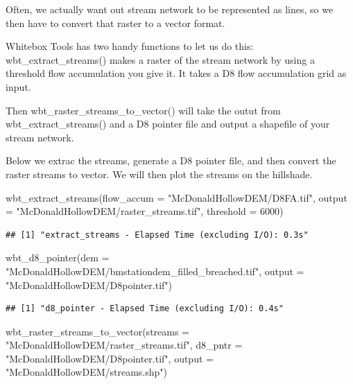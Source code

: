 \documentclass[
]{book}
\newenvironment{Shaded}{\begin{snugshade}}{\end{snugshade}}
\newcommand{\AttributeTok}[1]{\textcolor[rgb]{0.77,0.63,0.00}{#1}}
\newcommand{\DecValTok}[1]{\textcolor[rgb]{0.00,0.00,0.81}{#1}}
\newcommand{\FunctionTok}[1]{\textcolor[rgb]{0.00,0.00,0.00}{#1}}
\newcommand{\NormalTok}[1]{#1}
\newcommand{\StringTok}[1]{\textcolor[rgb]{0.31,0.60,0.02}{#1}}
\begin{document}
Often, we actually want out stream network to be represented as lines, so we then have to convert that raster to a vector format.

Whitebox Tools has two handy functions to let us do this: wbt\_extract\_streams() makes a raster of the stream network by using a threshold flow accumulation you give it. It takes a D8 flow accumulation grid as input.

Then wbt\_raster\_streams\_to\_vector() will take the outut from wbt\_extract\_streams() and a D8 pointer file and output a shapefile of your stream network.

Below we extrac the streams, generate a D8 pointer file, and then convert the raster streams to vector. We will then plot the streams on the hillshade.

\begin{Shaded}
\begin{Highlighting}[]
\FunctionTok{wbt\_extract\_streams}\NormalTok{(}\AttributeTok{flow\_accum =} \StringTok{"McDonaldHollowDEM/D8FA.tif"}\NormalTok{,}
                    \AttributeTok{output =} \StringTok{"McDonaldHollowDEM/raster\_streams.tif"}\NormalTok{,}
                    \AttributeTok{threshold =} \DecValTok{6000}\NormalTok{)}
\end{Highlighting}
\end{Shaded}

\begin{verbatim}
## [1] "extract_streams - Elapsed Time (excluding I/O): 0.3s"
\end{verbatim}

\begin{Shaded}
\begin{Highlighting}[]
\FunctionTok{wbt\_d8\_pointer}\NormalTok{(}\AttributeTok{dem =} \StringTok{"McDonaldHollowDEM/bmstationdem\_filled\_breached.tif"}\NormalTok{,}
               \AttributeTok{output =} \StringTok{"McDonaldHollowDEM/D8pointer.tif"}\NormalTok{)}
\end{Highlighting}
\end{Shaded}

\begin{verbatim}
## [1] "d8_pointer - Elapsed Time (excluding I/O): 0.4s"
\end{verbatim}

\begin{Shaded}
\begin{Highlighting}[]
\FunctionTok{wbt\_raster\_streams\_to\_vector}\NormalTok{(}\AttributeTok{streams =} \StringTok{"McDonaldHollowDEM/raster\_streams.tif"}\NormalTok{,}
                             \AttributeTok{d8\_pntr =} \StringTok{"McDonaldHollowDEM/D8pointer.tif"}\NormalTok{,}
                             \AttributeTok{output =} \StringTok{"McDonaldHollowDEM/streams.shp"}\NormalTok{)}
\end{Highlighting}
\end{Shaded}
\end{document}

